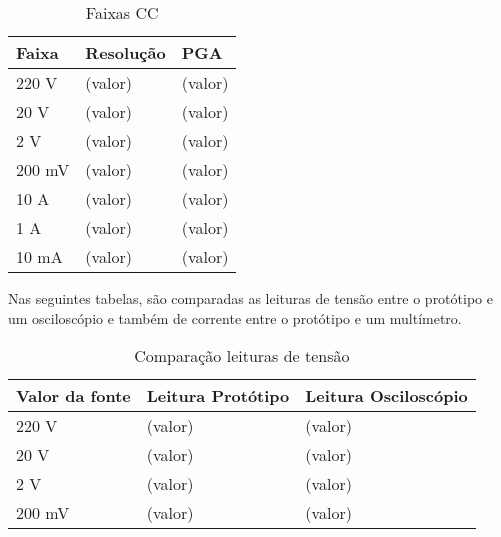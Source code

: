 \begin{table}[!ht]
    \centering
    \caption{Faixas \gls{CC}}
    \label{tab:faixasCC}
    \begin{tabular}{|l|l|l|}
        \hline
        \textbf{Faixa} & \textbf{Resolução} & \textbf{\gls{PGA}} \\ \hline
        220 V          & (valor)            & (valor)            \\ \hline
        20 V           & (valor)            & (valor)            \\ \hline
        2 V            & (valor)            & (valor)            \\ \hline
        200 mV         & (valor)            & (valor)            \\ \hline
        10 A           & (valor)            & (valor)            \\ \hline
        1 A            & (valor)            & (valor)            \\ \hline
        10 mA          & (valor)            & (valor)            \\ \hline
    \end{tabular}
\end{table}

Nas seguintes tabelas, são comparadas as leituras de tensão entre o protótipo e um osciloscópio e também de corrente entre o protótipo e um multímetro.

\begin{table}[!ht]
    \centering
    \caption{Comparação leituras de tensão}
    \label{tab:compT}
    \begin{tabular}{|l|l|l|}
        \hline
        \textbf{Valor da fonte} & \textbf{Leitura Protótipo} & \textbf{Leitura Osciloscópio} \\ \hline
        220 V                   & (valor)                    & (valor)                       \\ \hline
        20 V                    & (valor)                    & (valor)                       \\ \hline
        2 V                     & (valor)                    & (valor)                       \\ \hline
        200 mV                  & (valor)                    & (valor)                       \\ \hline
    \end{tabular}
\end{table}

